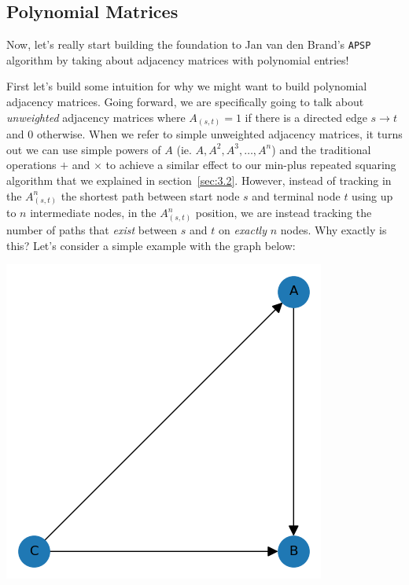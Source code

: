 \documentclass[12pt]{article}
\begin{document}
\subsection{Polynomial Matrices} \label{sec:3.3}

Now, let's really start building the foundation to Jan van den Brand's \texttt{APSP} algorithm by taking about adjacency matrices with polynomial entries!

First let's build some intuition for why we might want to build polynomial adjacency matrices. Going forward, we are specifically going to talk about \emph{unweighted} adjacency matrices where $A_{(s, t)} = 1$ if there is a directed edge $s \to t$ and $0$ otherwise. When we refer to simple unweighted adjacency matrices, it turns out we can use simple powers of $A$ (ie. $A, A^2, A^3, \ldots, A^n$) and the traditional operations $+$ and $\times$ to achieve a similar effect to our min-plus repeated squaring algorithm that we explained in section~\ref{sec:3.2}. However, instead of tracking in the $A^n_{(s, t)}$ the shortest path between start node $s$ and terminal node $t$ using up to $n$ intermediate nodes, in the $A^n_{(s, t)}$ position, we are instead tracking the number of paths that \emph{exist} between $s$ and $t$ on \emph{exactly} $n$ nodes. Why exactly is this? Let's consider a simple example with the graph below:

\begin{center}
    \includegraphics[scale=0.5]{media/Figure_2.png}
\end{center}
\end{document}
